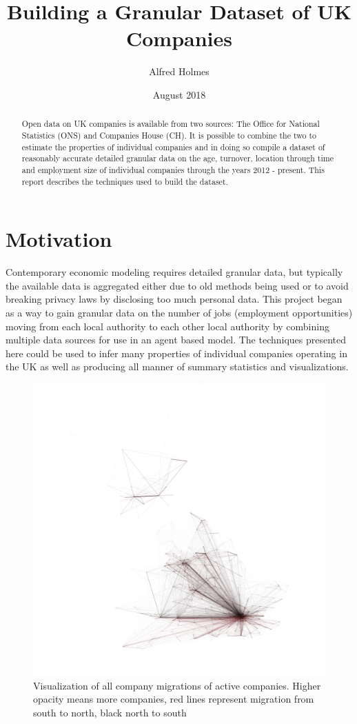 \documentclass[a4paper,10pt]{article}
\title{Building a Granular Dataset of UK Companies}
\author{Alfred Holmes}
\date{August 2018}
\begin{document}
\maketitle

\begin{abstract}
    Open data on UK companies is available from two sources: The Office for National Statistics (ONS) and Companies House (CH). It is possible to combine the two to estimate the properties of individual companies and in doing so compile a dataset of reasonably accurate detailed granular data on the age, turnover, location through time and employment size of individual companies through the years 2012 - present. This report describes the techniques used to build the dataset.
\end{abstract}
\section*{Motivation}
Contemporary economic modeling requires detailed granular data, but typically the available data is aggregated either due to old methods being used or to avoid breaking privacy laws by disclosing too much personal data. This project began as a way to gain granular data on the number of jobs (employment opportunities) moving from each local authority to each other local authority by combining multiple data sources for use in an agent based model. The techniques presented here could be used to infer many properties of individual companies operating in the UK as well as producing all manner of summary statistics and visualizations.
\begin{figure}[ht]
 \includegraphics[width=\textwidth]{graphics/visualisation}
 \caption{Visualization of all company migrations of active companies. Higher opacity means more companies, red lines represent migration from south to north, black north to south}
\end{figure}
\end{document}
